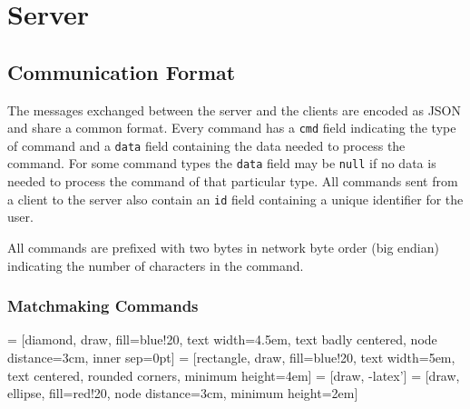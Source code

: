 \section{Server}

\subsection{Communication Format}
The messages exchanged between the server and the clients are encoded as JSON and share a common format.
Every command has a \texttt{cmd} field indicating the type of command and a \texttt{data} field containing the data needed to process the command.
For some command types the \texttt{data} field may be \texttt{null} if no data is needed to process the command of that particular type.
All commands sent from a client to the server also contain an \texttt{id} field containing a unique identifier for the user.

All commands are prefixed with two bytes in network byte order (big endian) indicating the number of characters in the command.


\subsubsection{Matchmaking Commands}


 = [diamond, draw, fill=blue!20, text width=4.5em, text badly centered, node distance=3cm, inner sep=0pt]
 = [rectangle, draw, fill=blue!20, text width=5em, text centered, rounded corners, minimum height=4em]
 = [draw, -latex']
 = [draw, ellipse, fill=red!20, node distance=3cm, minimum height=2em]

\begin{center}
\end{center}

